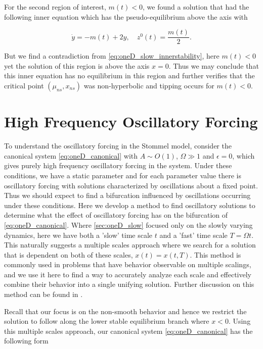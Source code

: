 For the second region of interest, $m(t)<0$, we found a solution that had the following inner equation which has the pseudo-equilibrium above the axis with

\begin{equation}\label{eq:oneD_slow_innerstability}
\dot{y}=-m(t)+2y, \quad z^0(t) = \frac{m(t)}{2}.
\end{equation}

But we find a contradiction from \eqref{eq:oneD_slow_innerstability}, here $m(t)<0$ yet the solution of this region is above the axis $x=0$. Thus we may conclude that this inner equation has no equilibrium in this region and further verifies that the critical point $(\mu_{ns},x_{ns})$ was non-hyperbolic and tipping occurs for $m(t)<0$.

\section{High Frequency Oscillatory Forcing}
\label{sec:oneD_highfreqosc}

To understand the oscillatory forcing in the Stommel model, consider the canonical system \eqref{eq:oneD_canonical} with $A\sim O(1)$, $\Omega\gg 1$ and $\epsilon=0$, which gives purely high frequency oscillatory forcing in the system. Under these conditions, we have a static parameter and for each parameter value there is oscillatory forcing with solutions characterized by oscillations about a fixed point. Thus we should expect to find a bifurcation influenced by oscillations occurring under these conditions. Here we develop a method to find oscillatory solutions to determine what the effect of oscillatory forcing has on the bifurcation of \eqref{eq:oneD_canonical}. Where \autoref{sec:oneD_slow} focused only on the slowly varying dynamics, here we have both a 'slow' time scale $t$ and a 'fast' time scale $T=\Omega t$. This naturally suggests a multiple scales approach where we search for a solution that is dependent on both of these scales, $x(t)=x(t,T)$. This method is commonly used in problems that have behavior observable on multiple scalings, and we use it here to find a way to accurately analyze each scale and effectively combine their behavior into a single unifying solution. Further discussion on this method can be found in \cite{sanchez1996method}.

Recall that our focus is on the non-smooth behavior and hence we restrict the solution to follow along the lower stable equilibrium branch where $x<0$. Using this multiple scales approach, our canonical system \eqref{eq:oneD_canonical} has the following form

